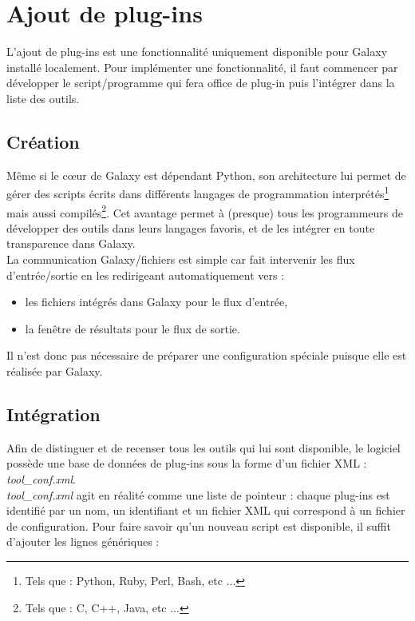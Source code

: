 \newpage
\section{Ajout de plug-ins}

L'ajout de plug-ins est une fonctionnalité uniquement disponible pour Galaxy installé localement. Pour implémenter une fonctionnalité, il faut commencer par développer le script/programme qui fera office de plug-in puis l'intégrer dans la liste des outils.

\subsection{Création}

Même si le cœur de Galaxy est dépendant Python, son architecture lui permet de gérer des scripts écrits dans différents langages de programmation interprétés\footnote{Tels que : Python, Ruby, Perl, Bash, etc ...} mais aussi compilés\footnote{Tels que : C, C++, Java, etc ...}. Cet avantage permet à (presque) tous les programmeurs de développer des outils dans leurs langages favoris, et de les intégrer en toute transparence dans Galaxy.\\

La communication Galaxy/fichiers est simple car fait intervenir les flux d'entrée/sortie en les redirigeant automatiquement vers :
\begin{itemize}
\item les fichiers intégrés dans Galaxy pour le flux d'entrée,
\item la fenêtre de résultats pour le flux de sortie.\\
\end{itemize}

Il n'est donc pas nécessaire de préparer une configuration spéciale puisque elle est réalisée par Galaxy.

\subsection{Intégration}

Afin de distinguer et de recenser tous les outils qui lui sont disponible, le logiciel possède une base de données de plug-ins sous la forme d'un fichier XML : \textit{tool\_conf.xml}.\\

\textit{tool\_conf.xml} agit en réalité comme une liste de pointeur : chaque plug-ins est identifié par un nom, un identifiant et un fichier XML qui correspond à un fichier de configuration. Pour faire savoir qu'un nouveau script est disponible, il suffit d'ajouter les lignes génériques :


